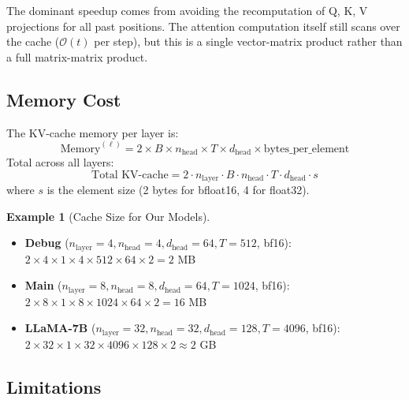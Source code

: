\documentclass[11pt, a4paper]{article}
\theoremstyle{definition}
\newtheorem{example}{Example}[section]
\newcommand{\dhead}{d_{\text{head}}}
\newcommand{\nhead}{n_{\text{head}}}
\newcommand{\nlayer}{n_{\text{layer}}}
\begin{document}
The dominant speedup comes from avoiding the recomputation of Q, K, V projections for all past positions. The attention computation itself still scans over the cache ($\mathcal{O}(t)$ per step), but this is a single vector-matrix product rather than a full matrix-matrix product.

\subsection{Memory Cost}

The KV-cache memory per layer is:
\begin{equation}
    \text{Memory}^{(\ell)} = 2 \times B \times \nhead \times T \times \dhead \times \text{bytes\_per\_element}
\end{equation}
Total across all layers:
\begin{equation}
    \text{Total KV-cache} = 2 \cdot \nlayer \cdot B \cdot \nhead \cdot T \cdot \dhead \cdot s
\end{equation}
where $s$ is the element size (2 bytes for bfloat16, 4 for float32).

\begin{example}[Cache Size for Our Models]
\begin{itemize}[nosep]
    \item \textbf{Debug} ($\nlayer=4, \nhead=4, \dhead=64, T=512$, bf16): $2 \times 4 \times 1 \times 4 \times 512 \times 64 \times 2 = 2$ MB
    \item \textbf{Main} ($\nlayer=8, \nhead=8, \dhead=64, T=1024$, bf16): $2 \times 8 \times 1 \times 8 \times 1024 \times 64 \times 2 = 16$ MB
    \item \textbf{LLaMA-7B} ($\nlayer=32, \nhead=32, \dhead=128, T=4096$, bf16): $2 \times 32 \times 1 \times 32 \times 4096 \times 128 \times 2 \approx 2$ GB
\end{itemize}
\end{example}

\subsection{Limitations}
\end{document}
